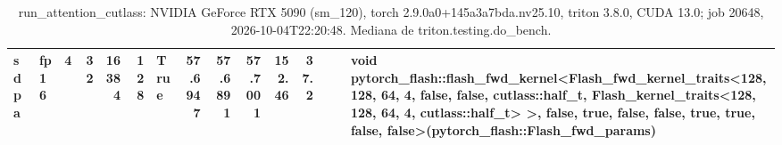 \begin{table}[htbp]
\begin{tabular}{llrrrrlrrrrrlll}
    sdpa & fp16 & 4 & 32 & 16384 & 128 & True & 57.6947 & 57.6891 & 57.7001 & 152.46 & 37.2 &  &  & void pytorch\_flash::flash\_fwd\_kernel<Flash\_fwd\_kernel\_traits<128, 128, 64, 4, false, false, cutlass::half\_t, Flash\_kernel\_traits<128, 128, 64, 4, cutlass::half\_t> >, false, true, false, false, true, true, false, false>(pytorch\_flash::Flash\_fwd\_params) \\
    \bottomrule
  \end{tabular}
  \caption{run\_attention\_cutlass: NVIDIA GeForce RTX 5090 (sm\_120), torch 2.9.0a0+145a3a7bda.nv25.10, triton 3.8.0, CUDA 13.0; job 20648, 2026-10-04T22:20:48. Mediana de triton.testing.do\_bench.}
  \label{tab:pascal-run-attention-cutlass}
\end{table}
